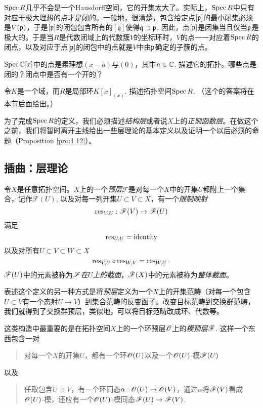 $\operatorname{Spec} R$几乎不会是一个Hausdorff空间，它的开集太大了。实际上，$\operatorname{Spec} R$中只有对应于极大理想的点才是闭的。一般地，很清楚，包含给定点$[\mathfrak{p}]$的最小闭集必须是$V(\mathfrak{p})$，于是$[\mathfrak{p}]$的闭包包含所有的$[\mathfrak{q}]$使得$\mathfrak{q}\supset\mathfrak{p}$. 因此，点$[\mathfrak{p}]$是闭集当且仅当$\mathfrak{p}$是极大的。于是当$R$是代数闭域上的代数簇$V$的坐标环时，$V$的点一一对应着$\operatorname{Spec} R$的闭点，以及对应于点$[\mathfrak{p}]$的闭包中的点就是$V$中由$\mathfrak{p}$确定的子簇的点。

\begin{exe}
	\begin{compactenum}[{(a)}]
		\item $\operatorname{Spec} \mathbb{C}[x]$中的点是素理想$(x-a)$与$(0)$，其中$a\in\mathbb{C}$. 描述它的拓扑。哪些点是闭的？闭点中是否有一个开的？
		\item 令$K$是一个域，而$R$是局部环$K[x]_{(x)}$. 描述拓扑空间$\operatorname{Spec} R$. （这个的答案将在本节后面给出。）
	\end{compactenum}
\end{exe}

为了完成$\operatorname{Spec} R$的定义，我们必须描述\textit{结构层}或者说$X$上的\textit{正则函数层}。在做这个之前，我们将暂时离开主线给出一些层理论的基本定义以及证明一个以后必须的命题（Proposition \ref{pro:1.12}）。

\subsection{插曲：层理论}

令$X$是任意拓扑空间。$X$上的一个\textit{预层}$\mathscr{F}$是对每一个$X$中的开集$U$都附上一个集合，记作$\mathscr{F}(U)$, 以及对每一列开集$U\subset V\subset X$，有一个\textit{限制映射}
\[
	\operatorname{res}_{V,U}:\mathscr{F}(V)\to \mathscr{F}(U)
\]
满足
\[
	\operatorname{res}_{U,U}=\mathrm{identity}
\]
以及对所有$U\subset V\subset W\subset X$
\[
	\operatorname{res}_{V,U}\circ \operatorname{res}_{W,V}=\operatorname{res}_{W,U}.
\]
$\mathscr{F}(U)$中的元素被称为\textit{$\mathscr{F}$在$U$上的截面}，$\mathscr{F}(X)$中的元素被称为\textit{整体截面}。

表述这个定义的另一种方式是将\textit{预层}定义为一个$X$上的开集范畴（对每一个包含$U\subset V$有一个态射$U\to V$）到集合范畴的反变函子。改变目标范畴到交换群范畴，我们就得到了交换群预层，类似地，可以将目标范畴改成环、代数等。

这类构造中最重要的是在拓扑空间$X$上的一个环预层$\mathscr{O}$上的\textit{模预层}$\mathscr{F}$. 这样一个东西包含一对
\begin{quote}
对每一个$X$的开集$U$，都有一个环$\mathscr{O}(U)$以及一个$\mathscr{O}(U)$\hyp 模$\mathscr{F}(U)$
\end{quote}
以及
\begin{quote}
任取包含$U\supset V$，有一个环同态$\alpha:\mathscr{O}(U)\to\mathscr{O}(V)$，通过$\alpha$将$\mathscr{F}(V)$看成$\mathscr{O}(U)$\hyp 模，还应有一个$\mathscr{O}(U)$\hyp 模同态$\mathscr{F}(U)\to\mathscr{F}(V)$.
\end{quote}

